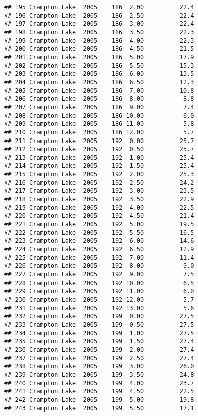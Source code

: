 \documentclass[
]{article}
\begin{document}
\begin{verbatim}
## 195 Crampton Lake  2005    186  2.00          22.4
## 196 Crampton Lake  2005    186  2.50          22.4
## 197 Crampton Lake  2005    186  3.00          22.4
## 198 Crampton Lake  2005    186  3.50          22.3
## 199 Crampton Lake  2005    186  4.00          22.3
## 200 Crampton Lake  2005    186  4.50          21.5
## 201 Crampton Lake  2005    186  5.00          17.9
## 202 Crampton Lake  2005    186  5.50          15.3
## 203 Crampton Lake  2005    186  6.00          13.5
## 204 Crampton Lake  2005    186  6.50          12.3
## 205 Crampton Lake  2005    186  7.00          10.8
## 206 Crampton Lake  2005    186  8.00           8.8
## 207 Crampton Lake  2005    186  9.00           7.4
## 208 Crampton Lake  2005    186 10.00           6.0
## 209 Crampton Lake  2005    186 11.00           5.8
## 210 Crampton Lake  2005    186 12.00           5.7
## 211 Crampton Lake  2005    192  0.00          25.7
## 212 Crampton Lake  2005    192  0.50          25.7
## 213 Crampton Lake  2005    192  1.00          25.4
## 214 Crampton Lake  2005    192  1.50          25.4
## 215 Crampton Lake  2005    192  2.00          25.3
## 216 Crampton Lake  2005    192  2.50          24.2
## 217 Crampton Lake  2005    192  3.00          23.5
## 218 Crampton Lake  2005    192  3.50          22.9
## 219 Crampton Lake  2005    192  4.00          22.5
## 220 Crampton Lake  2005    192  4.50          21.4
## 221 Crampton Lake  2005    192  5.00          19.5
## 222 Crampton Lake  2005    192  5.50          16.5
## 223 Crampton Lake  2005    192  6.00          14.6
## 224 Crampton Lake  2005    192  6.50          12.9
## 225 Crampton Lake  2005    192  7.00          11.4
## 226 Crampton Lake  2005    192  8.00           9.0
## 227 Crampton Lake  2005    192  9.00           7.5
## 228 Crampton Lake  2005    192 10.00           6.5
## 229 Crampton Lake  2005    192 11.00           6.0
## 230 Crampton Lake  2005    192 12.00           5.7
## 231 Crampton Lake  2005    192 13.00           5.6
## 232 Crampton Lake  2005    199  0.00          27.5
## 233 Crampton Lake  2005    199  0.50          27.5
## 234 Crampton Lake  2005    199  1.00          27.5
## 235 Crampton Lake  2005    199  1.50          27.4
## 236 Crampton Lake  2005    199  2.00          27.4
## 237 Crampton Lake  2005    199  2.50          27.4
## 238 Crampton Lake  2005    199  3.00          26.0
## 239 Crampton Lake  2005    199  3.50          24.8
## 240 Crampton Lake  2005    199  4.00          23.7
## 241 Crampton Lake  2005    199  4.50          22.5
## 242 Crampton Lake  2005    199  5.00          19.8
## 243 Crampton Lake  2005    199  5.50          17.1

\end{verbatim}
\end{document}

